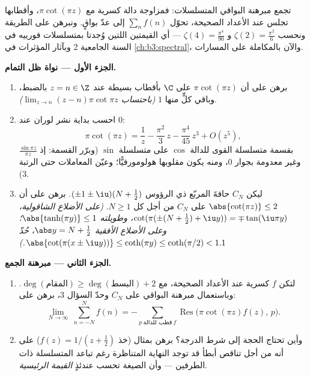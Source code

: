 \begin{problem}\label{pb:b3:residues:1}
تجمع مبرهنة البواقي المتسلسلات: فمزاوجة دالة كسرية مع
$\pi\cot(\pi z)$، وأقطابها تجلس عند الأعداد الصحيحة، تحوّل
$\sum_{n}f(n)$ إلى عدّ بواقٍ. ونبرهن على الطريقة ونحسب $\zeta(2) = \frac{\pi^2}{6}$
و $\zeta(4) =
\frac{\pi^4}{90}$ --- أي القيمتين اللتين وُجدتا بمتسلسلات فورييه في
السنة الجامعية 2 وبآثار المؤثرات في \cref{ch:b3:spectral}، والآن بالمكاملة
على المسارات.

\medskip
\noindent\textbf{الجزء الأول --- نواة ظل التمام.}
\begin{enumerate}
  \item برهن على أن $\pi\cot(\pi z)$  على $\C$
        بأقطاب بسيطة عند $z = n \in \Z$ بالضبط، وباقي كلٍّ
        منها $1$ \emph{(باحتساب $\lim_{z\to n}(z-n)\pi\cot\pi z$)}.
  \item احسب بداية نشر لوران عند $0$:
        \[
        \pi\cot(\pi z) = \frac1z - \frac{\pi^2}{3}\,z -
        \frac{\pi^4}{45}\,z^3 + O(z^5) ,
        \]
        بقسمة متسلسلة القوى للدالة $\cos$ على متسلسلة
        $\sin$ (وبرّر القسمة: إذ $\frac{\sin\pi z}{\pi z}$  وغير
        معدومة بجوار $0$، ومنه يكون مقلوبها هولومورفيًّا؛
        وعيّن المعاملات حتى الرتبة $3$).
  \item ليكن $C_N$ حافةَ المربّع ذي الرؤوس $(\pm1\pm\iu)(N + \frac12)$. برهن على
        أن $\abs{\cot(\pi z)} \leq 2$ على $C_N$ من أجل كل $N \geq
        1$. \emph{(على
        الأضلاع الشاقولية، $\cot(\pi(\pm(N +
        \frac12) + \iu y)) = \mp\tan(\iu\pi y)$، وطويلته $\abs{\tanh(\pi y)} \leq 1$؛ وعلى
        الأضلاع الأفقية $\abs y = N + \frac12$، حُدّ $\abs{\cot(\pi(x\pm\iu y))} \leq \coth(\pi y) \leq
        \coth(\pi/2) < 1.1$.)}
\end{enumerate}

\medskip
\noindent\textbf{الجزء الثاني --- مبرهنة الجمع.}
\begin{enumerate}[resume]
  \item لتكن $f$ كسرية  عند الأعداد الصحيحة، مع
        $\deg(\text{المقام}) \geq \deg(\text{البسط}) + 2$. وباستعمال مبرهنة البواقي على $C_N$ وحدّ
        السؤال 3، برهن على:
        \[
        \lim_{N\to\infty}\ \sum_{n = -N}^{N} f(n)
        = -\sum_{p\ \text{قطب للدالة}\ f}
        \operatorname{Res}\bigl(\pi\cot(\pi z)f(z),\,p\bigr).
        \]
  \item وأين تحتاج الحجة إلى شرط الدرجة؟ برهن بمثال (خذ
        $f(z) = 1/(z + \frac12)$) على أنه من أجل تناقص أبطأ قد توجد النهاية
        المتناظرة رغم تباعد المتسلسلة ذات الطرفين --- وأن
        الصيغة تحسب عندئذٍ \emph{القيمة الرئيسية}.
\end{enumerate}


\end{problem}
